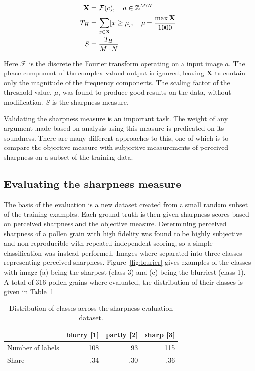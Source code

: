 \begin{equation}\label{eq:sharp}
  \begin{split}
    \mathbf{X} &= \mathcal{F}(a),\quad a\in \mathbb{Z}^{M\!\times \! N}\\
    T_H &= \sum_{x\in\mathbf{X}}[x\ge\mu],\quad \mu=\frac{\max \mathbf{X}}{1000}\\
    S &= \dfrac{T_H}{M\cdot N}
  \end{split}
\end{equation}

Here \(\mathcal{F}\) is the discrete the Fourier transform operating on a input image \(a\).
The phase component of the complex valued output is ignored, leaving \(\mathbf{X}\) to contain only the magnitude of the frequency components.
The scaling factor of the threshold value, \(\mu \), was found to produce good results on the data, without modification. \(S\) is the sharpness measure.

Validating the sharpness measure is an important task.
The weight of any argument made based on analysis using this measure is predicated on its soundness.
There are many different approaches to this, one of which is to compare the objective measure with subjective measurements of perceived sharpness on a subset of the training data.

\subsection{Evaluating the sharpness measure}
The basis of the evaluation is a new dataset created from a small random subset of the training examples.
Each ground truth is then given sharpness scores based on perceived sharpness and the objective measure.
Determining perceived sharpness of a pollen grain with high fidelity was found to be highly subjective and non-reproducible with repeated independent scoring, so a simple classification was instead performed.
Images where separated into three classes representing perceived sharpness.
Figure~\ref{fig:fourier} gives examples of the classes with image (a) being the sharpest (class 3) and (c) being the blurriest (class 1).
A total of 316 pollen grains where evaluated, the distribution of their classes is given in Table~\ref{tab:sharpness}

\begin{table}[htbp]
  \caption[Sharpness dataset distribution]{Distribution of classes across the sharpness evaluation dataset.}\label{tab:sharpness}
  \centering
  \begin{tabular}{lrrr} \toprule
    & blurry [1] & partly [2] & sharp [3]  \\ \midrule
    Number of labels & 108 & 93  & 115 \\
    Share            & .34 & .30 & .36 \\ \bottomrule
  \end{tabular}
\end{table}

